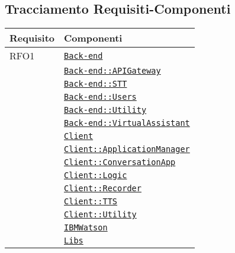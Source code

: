 \subsection{Tracciamento Requisiti-Componenti}
\normalsize
\begin{longtable}{|>{\centering}m{3cm}|m{10cm}<{\centering}|}
\hline 
\textbf{Requisito} & \textbf{Componenti}\\
\hline
\endhead
RFO1 & \hyperref[Back-end]{\texttt{Back-end}}\\
& \hyperref[Back-end::APIGateway]{\texttt{Back-end::APIGateway}}\\
& \hyperref[Back-end::STT]{\texttt{Back-end::STT}}\\
& \hyperref[Back-end::Users]{\texttt{Back-end::Users}}\\
& \hyperref[Back-end::Utility]{\texttt{Back-end::Utility}}\\
& \hyperref[Back-end::VirtualAssistant]{\texttt{Back-end::VirtualAssistant}}\\
& \hyperref[Client]{\texttt{Client}}\\
& \hyperref[Client::ApplicationManager]{\texttt{Client::ApplicationManager}}\\
& \hyperref[Client::ConversationApp]{\texttt{Client::ConversationApp}}\\
& \hyperref[Client::Logic]{\texttt{Client::Logic}}\\
& \hyperref[Client::Recorder]{\texttt{Client::Recorder}}\\
& \hyperref[Client::TTS]{\texttt{Client::TTS}}\\
& \hyperref[Client::Utility]{\texttt{Client::Utility}}\\
& \hyperref[IBMWatson]{\texttt{IBMWatson}}\\
& \hyperref[Libs]{\texttt{Libs}}\\ \hline


\end{longtable}
